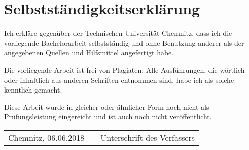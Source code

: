 \section*{Selbstständigkeitserklärung}


Ich erkläre gegenüber der Technischen Universität Chemnitz, dass ich die vorliegende Bachelorarbeit selbstständig und ohne Benutzung anderer als der angegebenen Quellen und Hilfsmittel angefertigt habe. 

Die vorliegende Arbeit ist frei von Plagiaten. Alle Ausführungen, die wörtlich oder inhaltlich aus anderen Schriften entnommen sind, habe ich als solche kenntlich gemacht.  

Diese Arbeit wurde in gleicher oder ähnlicher Form noch nicht als Prüfungsleistung eingereicht und ist auch noch nicht veröffentlicht. 

\vspace{2cm}

\begin{tabularx}{\columnwidth}{lXr}
  \hline 
  Chemnitz, 06.06.2018 &  &Unterschrift des Verfassers
\end{tabularx}
